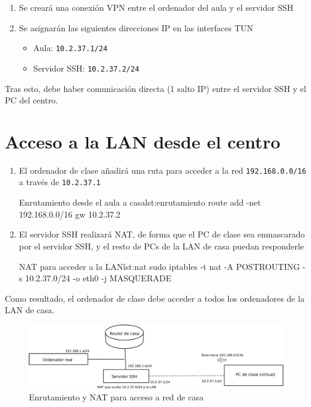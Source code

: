 \begin{enumerate}
\item Se creará una conexión VPN entre el ordenador del aula y el servidor SSH
\item Se asignarán las siguientes direcciones IP en las interfaces TUN
  \begin{itemize}
  \item Aula: \texttt{10.2.37.1/24}
  \item Servidor SSH: \texttt{10.2.37.2/24}
  \end{itemize}
\end{enumerate}

Tras esto, debe haber comunicación directa (1 salto IP) entre el servidor SSH y el PC del centro.


\section{Acceso a la LAN desde el centro}
\begin{enumerate}
\item El ordenador de clase añadirá una ruta para acceder a la red \texttt{192.168.0.0/16} a través de \texttt{10.2.37.1}

  \begin{listadoshell}{Enrutamiento desde el aula a casa}{lst:enrutamiento}
    route add -net 192.168.0.0/16 gw 10.2.37.2
  \end{listadoshell}
  
\item El servidor SSH realizará NAT, de forma que el PC de clase sea enmascarado por el servidor SSH, y el resto de PCs de la LAN de casa puedan responderle
  
  \begin{listadoshell}{NAT para acceder a la LAN}{lst:nat}
    sudo iptables -t nat -A POSTROUTING -s 10.2.37.0/24 -o eth0 -j MASQUERADE
  \end{listadoshell}
  

\end{enumerate}

Como resultado, el ordenador de clase debe acceder a todos los ordenadores de la LAN de casa.

\begin{figure}[h]
  \begin{center}
    \includegraphics[width=.9\textwidth]{./media/practica-vpn-nat.pdf}
  \end{center}
  \caption{Enrutamiento y NAT para acceso a red de casa}\label{fig:enrutamiento-y-nat}
\end{figure}

